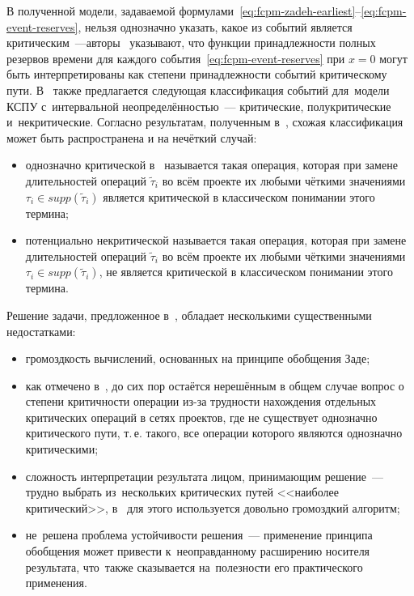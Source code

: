 В полученной модели, задаваемой формулами~\eqref{eq:fcpm-zadeh-earliest}--\eqref{eq:fcpm-event-reserves}, нельзя однозначно указать, какое из событий является критическим~---авторы~\cite{Balashov_IPU} указывают, что функции принадлежности полных резервов времени для каждого события~\eqref{eq:fcpm-event-reserves} при $x=0$ могут быть интерпретированы как степени принадлежности событий критическому пути. В~\cite{Balashov_IPU} также предлагается следующая классификация событий для~модели КСПУ с~интервальной неопределённостью~--- критические, полукритические и~некритические. Согласно результатам, полученным в~\cite{Chanas_Zielinski_Criticality}, схожая классификация может быть распространена и на нечёткий случай:
\begin{itemize}
  \item однозначно критической в~\cite{Chanas_Zielinski_Criticality} называется такая операция, которая при замене длительностей операций $\tilde \tau_i$ во всём проекте их любыми чёткими значениями $\tau_i\in supp\left( \tilde \tau_i \right)$ является критической в классическом понимании этого термина;
  \item потенциально некритической называется такая операция, которая при замене длительностей операций $\tilde \tau_i$ во всём проекте их любыми чёткими значениями $\tau_i\in supp\left( \tilde \tau_i \right)$, не является критической в классическом понимании этого термина.
\end{itemize}

Решение задачи, предложенное в~\cite{Balashov_IPU}, обладает несколькими существенными недостатками:
\begin{itemize}
  \item громоздкость вычислений, основанных на принципе обобщения Заде;
  \item как отмечено в~\cite{Chanas_Zielinski_Criticality}, до сих пор остаётся нерешённым в общем случае вопрос о степени критичности операции из-за трудности нахождения отдельных критических операций в сетях проектов, где не существует однозначно критического пути, т.\,е. такого, все операции которого являются однозначно критическими;
  \item сложность интерпретации результата лицом, принимающим решение~--- трудно выбрать из~нескольких критических путей <<наиболее критический>>, в~\cite{Chanas_Zielinski_Criticality} для этого используется довольно громоздкий алгоритм;
  \item не~решена проблема устойчивости решения~--- применение принципа обобщения может привести к~неоправданному расширению носителя результата, что~также сказывается на~полезности его практического применения.
\end{itemize}

